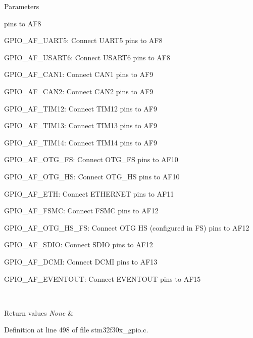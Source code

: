 \begin{DoxyParams}{Parameters}
\begin{DoxyItemize}
pins to A\-F8 \item G\-P\-I\-O\-\_\-\-A\-F\-\_\-\-U\-A\-R\-T5\-: Connect U\-A\-R\-T5 pins to A\-F8 \item G\-P\-I\-O\-\_\-\-A\-F\-\_\-\-U\-S\-A\-R\-T6\-: Connect U\-S\-A\-R\-T6 pins to A\-F8 \item G\-P\-I\-O\-\_\-\-A\-F\-\_\-\-C\-A\-N1\-: Connect C\-A\-N1 pins to A\-F9 \item G\-P\-I\-O\-\_\-\-A\-F\-\_\-\-C\-A\-N2\-: Connect C\-A\-N2 pins to A\-F9 \item G\-P\-I\-O\-\_\-\-A\-F\-\_\-\-T\-I\-M12\-: Connect T\-I\-M12 pins to A\-F9 \item G\-P\-I\-O\-\_\-\-A\-F\-\_\-\-T\-I\-M13\-: Connect T\-I\-M13 pins to A\-F9 \item G\-P\-I\-O\-\_\-\-A\-F\-\_\-\-T\-I\-M14\-: Connect T\-I\-M14 pins to A\-F9 \item G\-P\-I\-O\-\_\-\-A\-F\-\_\-\-O\-T\-G\-\_\-\-F\-S\-: Connect O\-T\-G\-\_\-\-F\-S pins to A\-F10 \item G\-P\-I\-O\-\_\-\-A\-F\-\_\-\-O\-T\-G\-\_\-\-H\-S\-: Connect O\-T\-G\-\_\-\-H\-S pins to A\-F10 \item G\-P\-I\-O\-\_\-\-A\-F\-\_\-\-E\-T\-H\-: Connect E\-T\-H\-E\-R\-N\-E\-T pins to A\-F11 \item G\-P\-I\-O\-\_\-\-A\-F\-\_\-\-F\-S\-M\-C\-: Connect F\-S\-M\-C pins to A\-F12 \item G\-P\-I\-O\-\_\-\-A\-F\-\_\-\-O\-T\-G\-\_\-\-H\-S\-\_\-\-F\-S\-: Connect O\-T\-G H\-S (configured in F\-S) pins to A\-F12 \item G\-P\-I\-O\-\_\-\-A\-F\-\_\-\-S\-D\-I\-O\-: Connect S\-D\-I\-O pins to A\-F12 \item G\-P\-I\-O\-\_\-\-A\-F\-\_\-\-D\-C\-M\-I\-: Connect D\-C\-M\-I pins to A\-F13 \item G\-P\-I\-O\-\_\-\-A\-F\-\_\-\-E\-V\-E\-N\-T\-O\-U\-T\-: Connect E\-V\-E\-N\-T\-O\-U\-T pins to A\-F15 \end{DoxyItemize}
\\
\hline
\end{DoxyParams}

\begin{DoxyRetVals}{Return values}
{\em None} & \\
\hline
\end{DoxyRetVals}


Definition at line 498 of file stm32f30x\-\_\-gpio.\-c.


